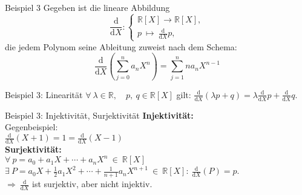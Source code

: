 \documentclass[AERbeamer%
,handout%
,optBeamerClassicFormat%
,optLeftEquations   %
]{AERlatex}
\begin{document}
%
    \begin{frame}{Beispiel 3}
        Gegeben ist die lineare Abbildung
        \begin{equation*}
            \frac{\mathrm{d}}{\mathrm{d} X}:\left\{\begin{array}{l}
                                                       \mathbb{R}[X] \rightarrow \mathbb{R}[X], \\
                                                       p ~ \mapsto ~ \frac{\mathrm{d}}{\mathrm{d} X} p,
            \end{array}\right.
        \end{equation*}
        die jedem Polynom seine Ableitung zuweist nach dem Schema: \\
        \begin{equation*}
            \frac{\mathrm{d}}{\mathrm{d} X}\left(\sum_{j=0}^n a_n X^n\right)=\sum_{j=1}^n n a_n X^{n-1}
        \end{equation*}
    \end{frame}
%
    \begin{frame}{Beispiel 3: Linearität}
        \setlength{\baselineskip}{1.6\baselineskip}
        $\forall ~ \lambda \in \mathbb{R}, \quad p,~ q \in \mathbb{R}[X]$ gilt: \hspace{2em}
        $\frac{\mathrm{d}}{\mathrm{d} X}(\lambda p+q)=\lambda \frac{\mathrm{d}}{\mathrm{d} X} p+\frac{\mathrm{d}}{\mathrm{d} X} q$.
    \end{frame}
%
    \begin{frame}{Beispiel 3: Injektivität, Surjektivität}
        \setlength{\baselineskip}{1.6\baselineskip}
        \textbf{Injektivität:} \\
        Gegenbeispiel: \\
        $\frac{\mathrm{d}}{\mathrm{d} X}(X+1)=1=\frac{\mathrm{d}}{\mathrm{d} X}(X-1)$ \\ \pause
        \vspace{1em}
        \textbf{Surjektivität:} \\
        $\forall ~ p=a_0+a_1 X+\cdots+a_n X^n ~ \in ~ \mathbb{R}[X]$ \\
        $\exists ~ P=a_0 X+\frac{1}{2} a_1 X^2+\cdots+\frac{1}{n+1} a_n X^{n+1} ~ \in ~ \mathbb{R}[X]: ~ \frac{\mathrm{d}}{\mathrm{d} X} (P) = p$. \\ \pause
        $\Rightarrow ~ \frac{\mathrm{d}}{\mathrm{d} X}$ ist surjektiv, aber nicht injektiv.
    \end{frame}
%
\end{document}
